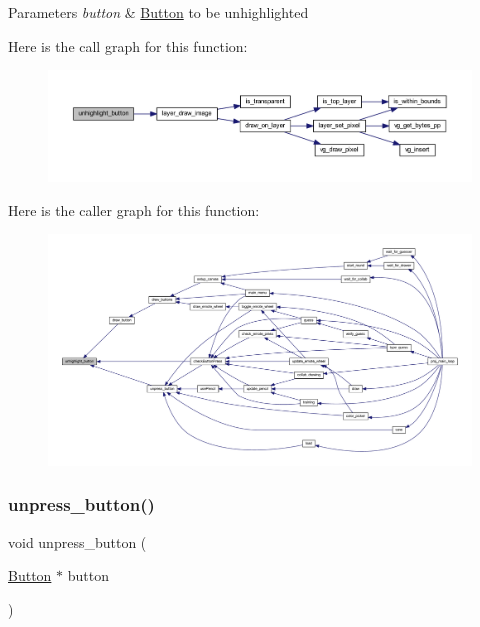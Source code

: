 \begin{DoxyParams}{Parameters}
{\em button} & \mbox{\hyperlink{struct_button}{Button}} to be unhighlighted \\
\hline
\end{DoxyParams}
Here is the call graph for this function\+:\nopagebreak
\begin{figure}[H]
\begin{center}
\leavevmode
\includegraphics[width=350pt]{group__sprite_gaa28b2a8d13a3ab9e23c3d91691614c81_cgraph}
\end{center}
\end{figure}
Here is the caller graph for this function\+:\nopagebreak
\begin{figure}[H]
\begin{center}
\leavevmode
\includegraphics[width=350pt]{group__sprite_gaa28b2a8d13a3ab9e23c3d91691614c81_icgraph}
\end{center}
\end{figure}
\mbox{\label{group__sprite_gae98d092189bc279e8a79ce65a4d7f436}} 
\subsubsection{\texorpdfstring{unpress\+\_\+button()}{unpress\_button()}}
{\footnotesize\ttfamily void unpress\+\_\+button (\begin{DoxyParamCaption}\item[{\mbox{\hyperlink{struct_button}{Button}} $\ast$}]{button }\end{DoxyParamCaption})}



